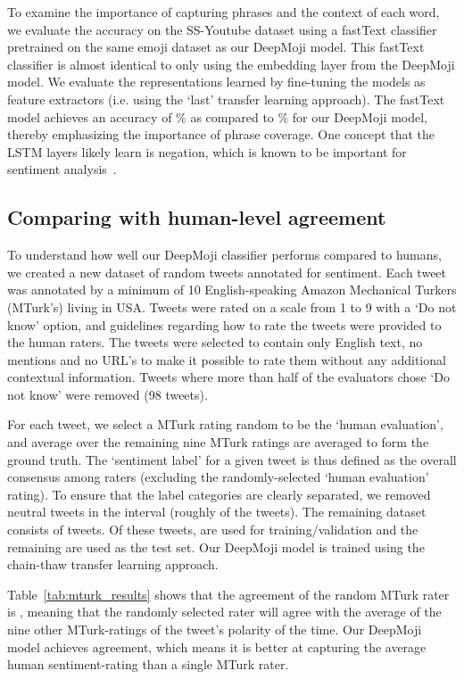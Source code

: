 \documentclass[11pt,a4paper]{article}
\begin{document}
To examine the importance of capturing phrases and the context of each word, we evaluate the accuracy on the SS-Youtube dataset using a fastText classifier pretrained on the same emoji dataset as our DeepMoji model. This fastText classifier is almost identical to only using the embedding layer from the DeepMoji model. We evaluate the representations learned by fine-tuning the models as feature extractors (i.e. using the `last' transfer learning approach). The fastText model achieves an accuracy of \% as compared to \% for our DeepMoji model, thereby emphasizing the importance of phrase coverage. One concept that the LSTM layers likely learn is negation, which is known to be important for sentiment analysis~\cite{wiegand2010survey}.


\subsection{Comparing with human-level agreement}
\label{sub_sec:comparing_humans}

To understand how well our DeepMoji classifier performs compared to humans, we created a new dataset of random tweets annotated for sentiment. Each tweet was annotated by a minimum of 10 English-speaking Amazon Mechanical Turkers (MTurk's) living in USA. Tweets were rated on a scale from 1 to 9 with a `Do not know' option, and guidelines regarding how to rate the tweets were provided to the human raters. The tweets were selected to contain only English text, no mentions and no URL's to make it possible to rate them without any additional contextual information. Tweets where more than half of the evaluators chose `Do not know' were removed (98 tweets).

For each tweet, we select a MTurk rating random to be the `human evaluation', and average over the remaining nine MTurk ratings are averaged to form the ground truth. The `sentiment label' for a given tweet is thus defined as the overall consensus among raters (excluding the randomly-selected `human evaluation' rating). To ensure that the label categories are clearly separated, we removed neutral tweets in the interval  (roughly  of the tweets). The remaining dataset consists of  tweets. Of these tweets,  are used for training/validation and the remaining are used as the test set. Our DeepMoji model is trained using the chain-thaw transfer learning approach.

Table~\ref{tab:mturk_results} shows that the agreement of the random MTurk rater is , meaning that the randomly selected rater will agree with the average of the nine other MTurk-ratings of the tweet's polarity  of the time. Our DeepMoji model achieves  agreement, which means it is better at capturing the average human sentiment-rating than a single MTurk rater. 
\end{document}
